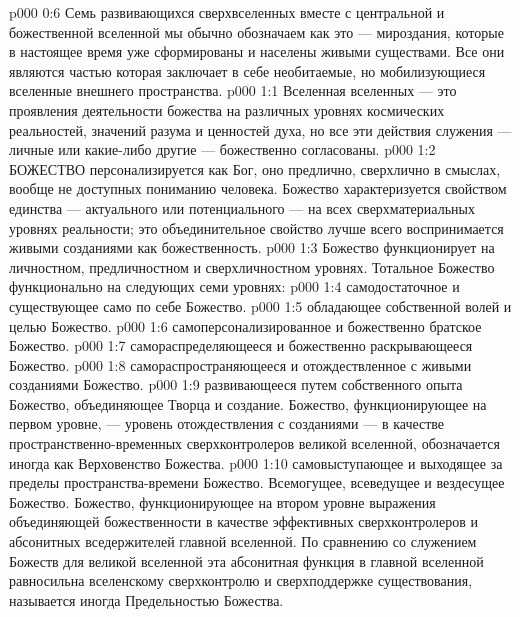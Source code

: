 \vs p000 0:6 Семь развивающихся сверхвселенных вместе с центральной и божественной вселенной мы обычно обозначаем как  это --- мироздания, которые в настоящее время уже сформированы и населены живыми существами. Все они являются частью  которая заключает в себе необитаемые, но мобилизующиеся вселенные внешнего пространства.
\vs p000 1:1 Вселенная вселенных --- это проявления деятельности божества на различных уровнях космических реальностей, значений разума и ценностей духа, но все эти действия служения --- личные или какие\hyp{}либо другие --- божественно согласованы.
\vs p000 1:2 \pc БОЖЕСТВО персонализируется как Бог, оно предлично, сверхлично в смыслах, вообще не доступных пониманию человека. Божество характеризуется свойством единства --- актуального или потенциального --- на всех сверхматериальных уровнях реальности; это объединительное свойство лучше всего воспринимается живыми созданиями как божественность.
\vs p000 1:3 \pc Божество функционирует на личностном, предличностном и сверхличностном уровнях. Тотальное Божество функционально на следующих семи уровнях:
\vs p000 1:4 \bibnobreakspace {} самодостаточное и существующее само по себе Божество.
\vs p000 1:5 \bibnobreakspace {} обладающее собственной волей и целью Божество.
\vs p000 1:6 \bibnobreakspace {} самоперсонализированное и божественно братское Божество.
\vs p000 1:7 \bibnobreakspace {} самораспределяющееся и божественно раскрывающееся Божество.
\vs p000 1:8 \bibnobreakspace {} самораспространяющееся и отождествленное с живыми созданиями Божество.
\vs p000 1:9 \bibnobreakspace {} развивающееся путем собственного опыта Божество, объединяющее Творца и создание. Божество, функционирующее на первом уровне, --- уровень отождествления с созданиями --- в качестве пространственно\hyp{}временных сверхконтролеров великой вселенной, обозначается иногда как Верховенство Божества.
\vs p000 1:10 \bibnobreakspace {} самовыступающее и выходящее за пределы пространства\hyp{}времени Божество. Всемогущее, всеведущее и вездесущее Божество. Божество, функционирующее на втором уровне выражения объединяющей божественности в качестве эффективных сверхконтролеров и абсонитных вседержителей главной вселенной. По сравнению со служением Божеств для великой вселенной эта абсонитная функция в главной вселенной равносильна вселенскому сверхконтролю и сверхподдержке существования, называется иногда Предельностью Божества.
